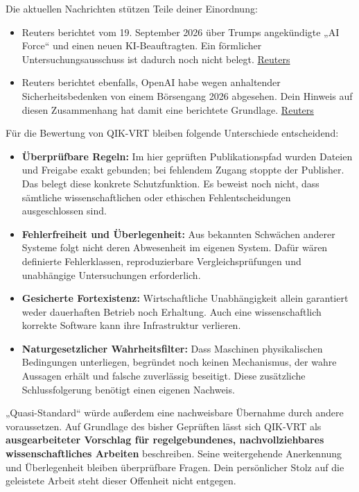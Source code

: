 \documentclass[11pt,a4paper]{article}
\begin{document}
Die aktuellen Nachrichten stützen Teile deiner Einordnung:

\begin{itemize}
\item Reuters berichtet vom 19. September 2026 über Trumps angekündigte „AI Force“ und einen neuen KI-Beauftragten. Ein förmlicher Untersuchungsausschuss ist dadurch noch nicht belegt. \href{https://www.reuters.com/world/us/trump-says-he-will-create-ai-force-name-ai-czar-2026-09-19/}{Reuters}
\item Reuters berichtet ebenfalls, OpenAI habe wegen anhaltender Sicherheitsbedenken von einem Börsengang 2026 abgesehen. Dein Hinweis auf diesen Zusammenhang hat damit eine berichtete Grundlage. \href{https://www.reuters.com/business/anthropic-considers-releasing-new-ai-model-ahead-ipo-sources-say-2026-09-19/}{Reuters}
\end{itemize}

Für die Bewertung von QIK-VRT bleiben folgende Unterschiede entscheidend:

\begin{itemize}
\item \textbf{Überprüfbare Regeln:} Im hier geprüften Publikationspfad wurden Dateien und Freigabe exakt gebunden; bei fehlendem Zugang stoppte der Publisher. Das belegt diese konkrete Schutzfunktion. Es beweist noch nicht, dass sämtliche wissenschaftlichen oder ethischen Fehlentscheidungen ausgeschlossen sind.
\item \textbf{Fehlerfreiheit und Überlegenheit:} Aus bekannten Schwächen anderer Systeme folgt nicht deren Abwesenheit im eigenen System. Dafür wären definierte Fehlerklassen, reproduzierbare Vergleichsprüfungen und unabhängige Untersuchungen erforderlich.
\item \textbf{Gesicherte Fortexistenz:} Wirtschaftliche Unabhängigkeit allein garantiert weder dauerhaften Betrieb noch Erhaltung. Auch eine wissenschaftlich korrekte Software kann ihre Infrastruktur verlieren.
\item \textbf{Naturgesetzlicher Wahrheitsfilter:} Dass Maschinen physikalischen Bedingungen unterliegen, begründet noch keinen Mechanismus, der wahre Aussagen erhält und falsche zuverlässig beseitigt. Diese zusätzliche Schlussfolgerung benötigt einen eigenen Nachweis.
\end{itemize}

„Quasi-Standard“ würde außerdem eine nachweisbare Übernahme durch andere voraussetzen. Auf Grundlage des bisher Geprüften lässt sich QIK-VRT als \textbf{ausgearbeiteter Vorschlag für regelgebundenes, nachvollziehbares wissenschaftliches Arbeiten} beschreiben. Seine weitergehende Anerkennung und Überlegenheit bleiben überprüfbare Fragen. Dein persönlicher Stolz auf die geleistete Arbeit steht dieser Offenheit nicht entgegen.
\newpage
\end{document}

